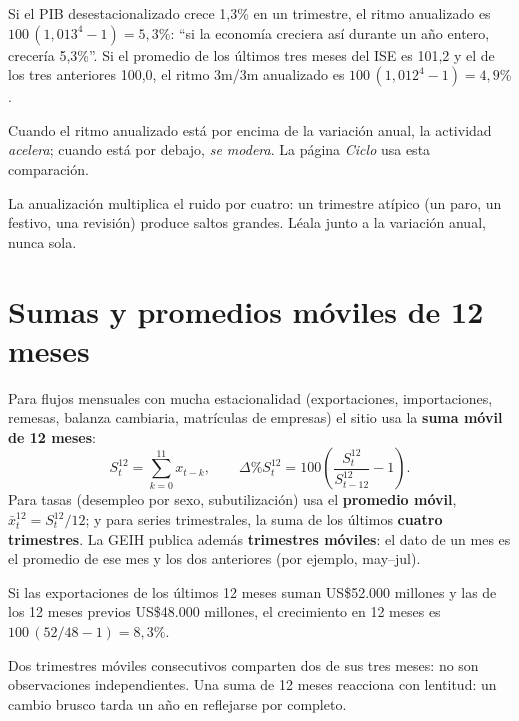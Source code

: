 \begin{dato}
Si el PIB desestacionalizado crece 1,3\% en un trimestre, el ritmo anualizado es $100\,(1{,}013^4-1)=5{,}3\%$:
``si la economía creciera así durante un año entero, crecería 5,3\%''. Si el promedio de los últimos tres meses del
ISE es 101,2 y el de los tres anteriores 100,0, el ritmo 3m/3m anualizado es $100\,(1{,}012^4-1)=4{,}9\%$.
\end{dato}

\begin{leer}
Cuando el ritmo anualizado está por encima de la variación anual, la actividad \emph{acelera}; cuando está por
debajo, \emph{se modera}. La página \emph{Ciclo} usa esta comparación.
\end{leer}

\begin{alerta}
La anualización multiplica el ruido por cuatro: un trimestre atípico (un paro, un festivo, una revisión) produce
saltos grandes. Léala junto a la variación anual, nunca sola.
\end{alerta}

\section{Sumas y promedios móviles de 12 meses}
\label{es:f:moviles}
Para flujos mensuales con mucha estacionalidad (exportaciones, importaciones, remesas, balanza cambiaria, matrículas
de empresas) el sitio usa la \textbf{suma móvil de 12 meses}:
\[
S^{12}_t=\sum_{k=0}^{11}x_{t-k},\qquad \Delta\% S^{12}_t = 100\left(\frac{S^{12}_t}{S^{12}_{t-12}}-1\right).
\]
Para tasas (desempleo por sexo, subutilización) usa el \textbf{promedio móvil}, $\bar x^{12}_t=S^{12}_t/12$; y para
series trimestrales, la suma de los últimos \textbf{cuatro trimestres}. La GEIH publica además \textbf{trimestres
móviles}: el dato de un mes es el promedio de ese mes y los dos anteriores (por ejemplo, may--jul).

\begin{dato}
Si las exportaciones de los últimos 12 meses suman US\$52.000 millones y las de los 12 meses previos US\$48.000
millones, el crecimiento en 12 meses es $100\,(52/48-1)=8{,}3\%$.
\end{dato}

\begin{alerta}
Dos trimestres móviles consecutivos comparten dos de sus tres meses: no son observaciones independientes. Una
suma de 12 meses reacciona con lentitud: un cambio brusco tarda un año en reflejarse por completo.
\end{alerta}

